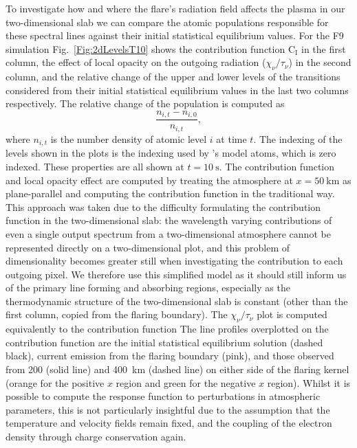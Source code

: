 To investigate how and where the flare's radiation field affects the plasma in our two-dimensional slab we can compare the atomic populations responsible for these spectral lines against their initial statistical equilibrium values.
For the F9 simulation Fig.~\ref{Fig:2dLevelsT10} shows the contribution function $\mathrm{C}_\mathrm{I}$ in the first column, the effect of local opacity on the outgoing radiation ($\chi_\nu/\tau_\nu$) in the second column, and the relative change of the upper and lower levels of the transitions considered from their initial statistical equilibrium values in the last two columns respectively.
The relative change of the population is computed as
\begin{equation}
    \frac{n_{i, t} - n_{i, 0}}{n_{i, t}},
\end{equation}
where $n_{i,t}$ is the number density of atomic level $i$ at time $t$.
The indexing of the levels shown in the plots is the indexing used by \Lw{}'s model atoms, which is zero indexed.
These properties are all shown at $t=\SI{10}{\second}$.
The contribution function and local opacity effect are computed by treating the atmosphere  at $x=\SI{50}{\kilo\metre}$ as plane-parallel and computing the contribution function in the traditional way.
This approach was taken due to the difficulty formulating the contribution function in the two-dimensional slab: the wavelength varying contributions of even a single output spectrum from a two-dimensional atmosphere cannot be represented directly on a two-dimensional plot, and this problem of dimensionality becomes greater still when investigating the contribution to each outgoing pixel.
We therefore use this simplified model as it should still inform us of the primary line forming and absorbing regions, especially as the thermodynamic structure of the two-dimensional slab is constant (other than the first column, copied from the flaring boundary).
The $\chi_\nu / \tau_\nu$ plot is computed equivalently to the contribution function
The line profiles overplotted on the contribution function are the initial statistical equilibrium solution (dashed black), current emission from the flaring boundary (pink), and those observed from 200 (solid line) and \SI{400}{\kilo\metre} (dashed line) on either side of the flaring kernel (orange for the positive $x$ region and green for the negative $x$ region).
Whilst it is possible to compute the response function to perturbations in atmospheric parameters, this is not particularly insightful due to the assumption that the temperature and velocity fields remain fixed, and the coupling of the electron density through charge conservation again.

